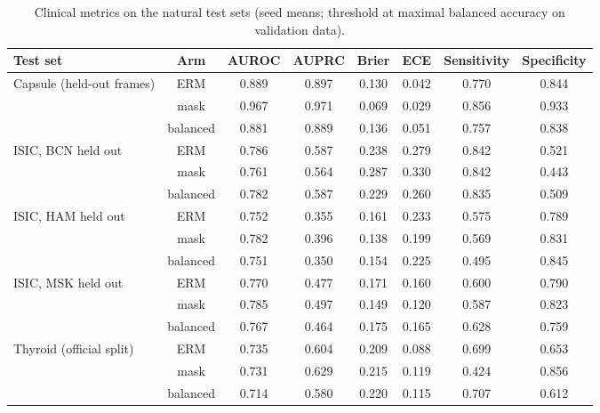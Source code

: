 \begin{table}[H]\centering\scriptsize
\caption{Clinical metrics on the natural test sets (seed means; threshold at maximal balanced accuracy on validation data).}\label{tab:clin}
\begin{tabular}{lccccccc}\toprule
Test set & Arm & AUROC & AUPRC & Brier & ECE & Sensitivity & Specificity \\\midrule
Capsule (held-out frames) & ERM & 0.889 & 0.897 & 0.130 & 0.042 & 0.770 & 0.844 \\
 & mask & 0.967 & 0.971 & 0.069 & 0.029 & 0.856 & 0.933 \\
 & balanced & 0.881 & 0.889 & 0.136 & 0.051 & 0.757 & 0.838 \\
ISIC, BCN held out & ERM & 0.786 & 0.587 & 0.238 & 0.279 & 0.842 & 0.521 \\
 & mask & 0.761 & 0.564 & 0.287 & 0.330 & 0.842 & 0.443 \\
 & balanced & 0.782 & 0.587 & 0.229 & 0.260 & 0.835 & 0.509 \\
ISIC, HAM held out & ERM & 0.752 & 0.355 & 0.161 & 0.233 & 0.575 & 0.789 \\
 & mask & 0.782 & 0.396 & 0.138 & 0.199 & 0.569 & 0.831 \\
 & balanced & 0.751 & 0.350 & 0.154 & 0.225 & 0.495 & 0.845 \\
ISIC, MSK held out & ERM & 0.770 & 0.477 & 0.171 & 0.160 & 0.600 & 0.790 \\
 & mask & 0.785 & 0.497 & 0.149 & 0.120 & 0.587 & 0.823 \\
 & balanced & 0.767 & 0.464 & 0.175 & 0.165 & 0.628 & 0.759 \\
Thyroid (official split) & ERM & 0.735 & 0.604 & 0.209 & 0.088 & 0.699 & 0.653 \\
 & mask & 0.731 & 0.629 & 0.215 & 0.119 & 0.424 & 0.856 \\
 & balanced & 0.714 & 0.580 & 0.220 & 0.115 & 0.707 & 0.612 \\
\bottomrule\end{tabular}
\end{table}
